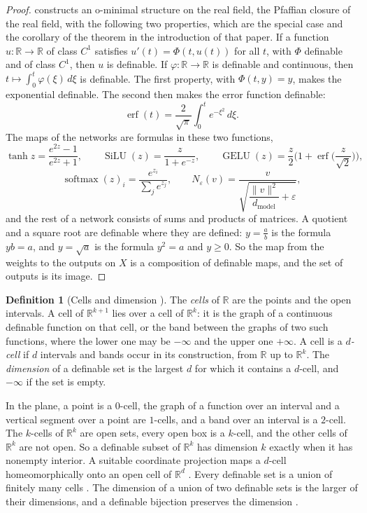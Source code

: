 \documentclass[10pt]{article}
\theoremstyle{definition}
\newtheorem{definition}[theorem]{Definition}
\theoremstyle{remark}
\newcommand{\R}{\mathbb{R}}
\newcommand{\dm}{d_{\mathrm{model}}}
\newcommand{\norm}[1]{\lVert #1\rVert}
\begin{document}
\begin{proof}
\citet{speissegger1997pfaffian} constructs an o-minimal structure on the real field, the Pfaffian closure of the real field, with the following two properties, which are the special case and the corollary of the theorem in the introduction of that paper. If a function $u : \R \to \R$ of class $C^1$ satisfies $u'(t) = \Phi(t, u(t))$ for all $t$, with $\Phi$ definable and of class $C^1$, then $u$ is definable. If $\varphi : \R \to \R$ is definable and continuous, then $t \mapsto \int_0^t \varphi(\xi)\,d\xi$ is definable. The first property, with $\Phi(t, y) = y$, makes the exponential definable. The second then makes the error function definable:
\[
\operatorname{erf}(t) = \frac{2}{\sqrt\pi}\int_0^t e^{-\xi^2}\,d\xi .
\]
The maps of the networks are formulas in these two functions,
\[
\tanh z = \frac{e^{2z} - 1}{e^{2z} + 1},\qquad \operatorname{SiLU}(z) = \frac{z}{1 + e^{-z}},\qquad \operatorname{GELU}(z) = \frac{z}{2}\Big(1 + \operatorname{erf}\Big(\frac{z}{\sqrt2}\Big)\Big),
\]
\[
\operatorname{softmax}(z)_i = \frac{e^{z_i}}{\sum_j e^{z_j}},\qquad N_\varepsilon(v) = \frac{v}{\sqrt{\dfrac{\norm{v}^2}{\dm} + \varepsilon}} ,
\]
and the rest of a network consists of sums and products of matrices. A quotient and a square root are definable where they are defined: $y = \frac{a}{b}$ is the formula $yb = a$, and $y = \sqrt{a}$ is the formula $y^2 = a$ and $y \ge 0$. So the map from the weights to the outputs on $X$ is a composition of definable maps, and the set of outputs is its image.
\end{proof}

\begin{definition}[Cells and dimension {\citep[Chapter~3, (2.3), and Chapter~4, (1.1)]{vandendries1998tame}}]\label{def:dimension}
The \emph{cells} of $\R$ are the points and the open intervals. A cell of $\R^{k+1}$ lies over a cell of $\R^k$: it is the graph of a continuous definable function on that cell, or the band between the graphs of two such functions, where the lower one may be $-\infty$ and the upper one $+\infty$. A cell is a \emph{$d$-cell} if $d$ intervals and bands occur in its construction, from $\R$ up to $\R^k$. The \emph{dimension} of a definable set is the largest $d$ for which it contains a $d$-cell, and $-\infty$ if the set is empty.
\end{definition}

In the plane, a point is a $0$-cell, the graph of a function over an interval and a vertical segment over a point are $1$-cells, and a band over an interval is a $2$-cell. The $k$-cells of $\R^k$ are open sets, every open box is a $k$-cell, and the other cells of $\R^k$ are not open. So a definable subset of $\R^k$ has dimension $k$ exactly when it has nonempty interior. A suitable coordinate projection maps a $d$-cell homeomorphically onto an open cell of $\R^d$ \citep[Chapter~3, (2.7)]{vandendries1998tame}. Every definable set is a union of finitely many cells \citep[Chapter~3, Theorem~(2.11)]{vandendries1998tame}. The dimension of a union of two definable sets is the larger of their dimensions, and a definable bijection preserves the dimension \citep[Chapter~4, Proposition~(1.3)]{vandendries1998tame}.
\end{document}
